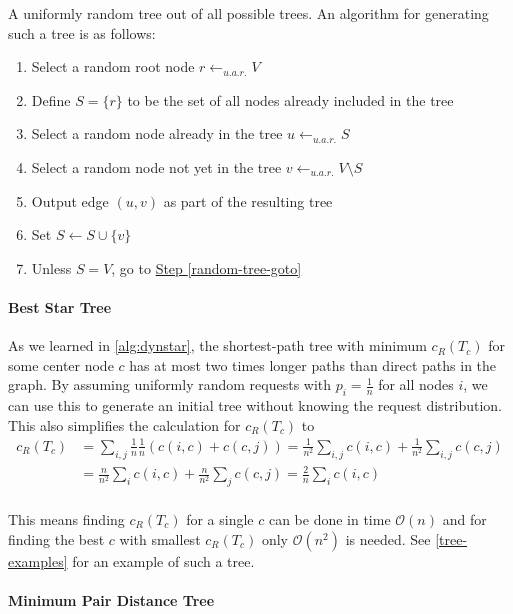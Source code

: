 \documentclass[a4paper, oneside]{discothesis}
\begin{document}
A uniformly random tree out of all possible trees. An algorithm for generating such a tree is as follows:

\begin{enumerate}
\item Select a random root node $r\gets_{u.a.r.}V$
\item Define $S=\{r\}$ to be the set of all nodes already included in the tree
\item Select a random node already in the tree $u\gets_{u.a.r.}S$
\label{random-tree-goto}
\item Select a random node not yet in the tree $v\gets_{u.a.r.}V\setminus S$
\item Output edge $(u,v)$ as part of the resulting tree
\item Set $S\gets S\cup\{v\}$
\item Unless $S=V$, go to \hyperref[random-tree-goto]{Step \ref{random-tree-goto}}
\end{enumerate}

\paragraph{Best Star Tree}\label{tree:star}

As we learned in \autoref{alg:dynstar}, the shortest-path tree with minimum $c_R(T_c)$ for some center node $c$ has at most two times longer paths than direct paths in the graph. By assuming uniformly random requests with $p_i=\frac{1}{n}$ for all nodes $i$, we can use this to generate an initial tree without knowing the request distribution. This also simplifies the calculation for $c_R(T_c)$ to
\begin{equation}
\begin{split}
c_R(T_c)&=\sum_{i,j}\frac{1}{n}\frac{1}{n}(c(i,c)+c(c,j))=\frac{1}{n^2}\sum_{i,j}c(i,c)+\frac{1}{n^2}\sum_{i,j}c(c,j) \\
&=\frac{n}{n^2}\sum_{i}c(i,c)+\frac{n}{n^2}\sum_{j}c(c,j)=\frac{2}{n}\sum_{i}c(i,c) \\
\end{split}
\end{equation}

This means finding $c_R(T_c)$ for a single $c$ can be done in time $\mathcal{O}(n)$ and for finding the best $c$ with smallest $c_R(T_c)$ only $\mathcal{O}(n^2)$ is needed. See \autoref{tree-examples} for an example of such a tree.

\paragraph{Minimum Pair Distance Tree}\label{tree:mpd}
\end{document}
